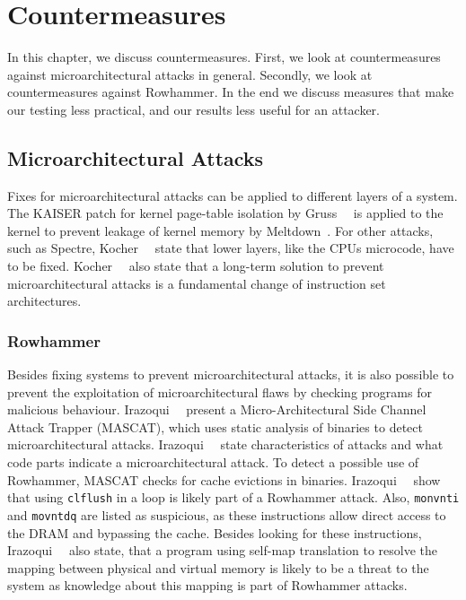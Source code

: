 \chapter{Countermeasures}\label{sec:countermeasure}

In this chapter, we discuss countermeasures. First, we look at countermeasures
against microarchitectural attacks in general. Secondly, we look at
countermeasures against Rowhammer. In the end we discuss measures that
make our testing less practical, and our results less useful for an
attacker.

\section{Microarchitectural Attacks}

Fixes for microarchitectural attacks can be applied to different layers of a
system. The KAISER patch for kernel page-table isolation by
Gruss~\etal~\cite{kaiserpaper} is applied to the kernel to prevent leakage of
kernel memory by Meltdown~\cite{meltdown}. For other attacks, such as Spectre,
Kocher~\etal~\cite{spectre} state that lower layers, like the
CPU\textquotesingle s microcode, have to be fixed. Kocher~\etal~\cite{spectre}
also state that a long-term solution to prevent microarchitectural attacks is a
fundamental change of instruction set architectures.

\subsection{Rowhammer}

Besides fixing systems to prevent microarchitectural attacks, it is also
possible to prevent the exploitation of microarchitectural flaws by checking
programs for malicious behaviour. Irazoqui~\etal~\cite{mascat} present a
Micro-Architectural Side Channel Attack Trapper (MASCAT), which uses static
analysis of binaries to detect microarchitectural attacks.
Irazoqui~\etal~\cite{mascat} state characteristics of attacks and what code
parts indicate a microarchitectural attack. To detect a possible use of
Rowhammer, MASCAT checks for cache evictions in binaries.
Irazoqui~\etal~\cite{mascat} show that using \texttt{clflush} in a loop is
likely part of a Rowhammer attack. Also, \texttt{monvnti} and \texttt{movntdq}
are listed as suspicious, as these instructions allow direct access to the DRAM
and bypassing the cache. Besides looking for these instructions,
Irazoqui~\etal~\cite{mascat} also state, that a program using self-map
translation to resolve the mapping between physical and virtual memory is likely
to be a threat to the system as knowledge about this mapping is part of
Rowhammer attacks.

